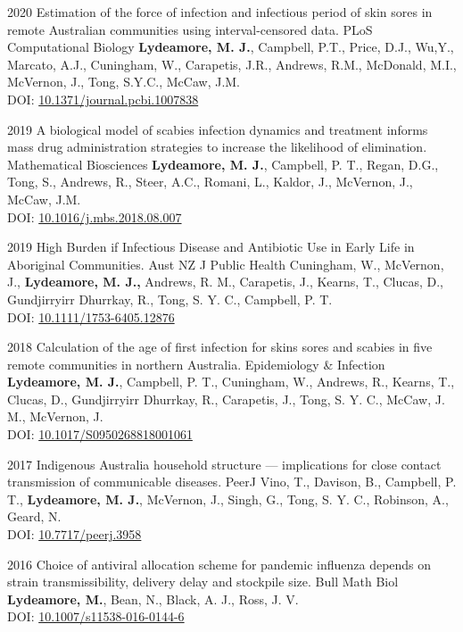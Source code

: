 \documentclass[9pt]{developercv} %
\begin{document}
\begin{publist}
    \publication
        {2020}
        {Estimation of the force of infection and infectious period of skin sores in remote Australian communities using interval-censored data.}
        {PLoS Computational Biology}
        {\textbf{Lydeamore, M. J.}, Campbell, P.T., Price, D.J., Wu,Y., Marcato, A.J., Cuningham, W., Carapetis, J.R., Andrews, R.M., McDonald, M.I., McVernon, J., Tong, S.Y.C., McCaw, J.M. \\
        DOI: \href{https://doi.org/10.1371/journal.pcbi.1007838}{10.1371/journal.pcbi.1007838}}
        
    \publication
        {2019}
        {A biological model of scabies infection dynamics and treatment informs mass drug administration strategies to increase the likelihood of elimination.}
        {Mathematical Biosciences}
        {\textbf{Lydeamore, M. J.}, Campbell, P. T., Regan, D.G., Tong, S., Andrews, R., Steer, A.C., Romani, L., Kaldor, J., McVernon, J., McCaw, J.M. \\
        DOI: \href{https://doi.org/10.1016/j.mbs.2018.08.007}{10.1016/j.mbs.2018.08.007}}
        
    \publication
        {2019}
        {High Burden if Infectious Disease and Antibiotic Use in Early Life in Aboriginal Communities.}
        {Aust NZ J Public Health}
        {Cuningham, W., McVernon, J., \textbf{Lydeamore, M. J.,} Andrews, R. M., Carapetis, J., Kearns, T., Clucas, D., Gundjirryirr Dhurrkay, R., Tong, S. Y. C., Campbell, P. T. \\
        DOI: \href{https://doi.org/10.1111/1753-6405.12876}{10.1111/1753-6405.12876}}

    \publication
        {2018}
        {Calculation of the age of first infection for skins sores and scabies in five remote communities in northern Australia.}
        {Epidemiology \& Infection}
        {\textbf{Lydeamore, M. J.}, Campbell, P. T., Cuningham, W., Andrews, R., Kearns, T., Clucas, D., Gundjirryirr Dhurrkay, R., Carapetis, J., Tong, S. Y. C., McCaw, J. M., McVernon, J. \\
        DOI: \href{https://doi.org/10.1017/S0950268818001061}{10.1017/S0950268818001061}}

    \publication
        {2017}
        {Indigenous Australia household structure --- implications for close contact transmission of communicable diseases.}
        {PeerJ}
        {Vino, T., Davison, B., Campbell, P. T., \textbf{Lydeamore, M. J.}, McVernon, J., Singh, G., Tong, S. Y. C., Robinson, A., Geard, N. \\
        DOI: \href{http://doi.org/10.7717/peerj.3958}{10.7717/peerj.3958}}

    \publication
        {2016}
        {Choice of antiviral allocation scheme for pandemic influenza depends on strain transmissibility, delivery delay and stockpile size.}
        {Bull Math Biol}
        {\textbf{Lydeamore, M.}, Bean, N., Black, A. J., Ross, J. V. \\
        DOI: \href{http://doi.org/10.1007/s11538-016-0144-6}{10.1007/s11538-016-0144-6}}
\end{publist}
\end{document}
